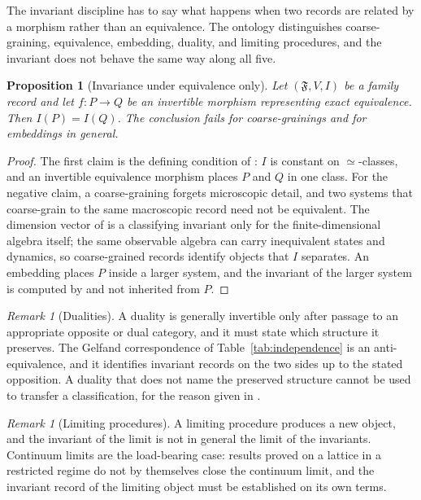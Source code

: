 \documentclass[11pt,letterpaper]{article}
\newtheorem{proposition}[theorem]{Proposition}
\theoremstyle{definition}
\theoremstyle{remark}
\newtheorem{remark}[theorem]{Remark}
\begin{document}
The invariant discipline has to say what happens when two records are related by a morphism rather than an equivalence. The ontology distinguishes coarse-graining, equivalence, embedding, duality, and limiting procedures, and the invariant does not behave the same way along all five.

\begin{proposition}[Invariance under equivalence only]
\label{prop:invariance}
Let $(\mathfrak{F}, V, I)$ be a family record and let $f \colon P \to Q$ be an invertible morphism representing exact equivalence. Then $I(P) = I(Q)$. The conclusion fails for coarse-grainings and for embeddings in general.
\end{proposition}

\begin{proof}
The first claim is the defining condition of : $I$ is constant on $\simeq$-classes, and an invertible equivalence morphism places $P$ and $Q$ in one class. For the negative claim, a coarse-graining forgets microscopic detail, and two systems that coarse-grain to the same macroscopic record need not be equivalent. The dimension vector of  is a classifying invariant only for the finite-dimensional algebra itself; the same observable algebra can carry inequivalent states and dynamics, so coarse-grained records identify objects that $I$ separates. An embedding places $P$ inside a larger system, and the invariant of the larger system is computed by  and not inherited from $P$.
\end{proof}

\begin{remark}[Dualities]
\label{rem:duality}
A duality is generally invertible only after passage to an appropriate opposite or dual category, and it must state which structure it preserves. The Gelfand correspondence of Table~\ref{tab:independence} is an anti-equivalence, and it identifies invariant records on the two sides up to the stated opposition. A duality that does not name the preserved structure cannot be used to transfer a classification, for the reason given in .
\end{remark}

\begin{remark}[Limiting procedures]
\label{rem:limits}
A limiting procedure produces a new object, and the invariant of the limit is not in general the limit of the invariants. Continuum limits are the load-bearing case: results proved on a lattice in a restricted regime do not by themselves close the continuum limit, and the invariant record of the limiting object must be established on its own terms.
\end{remark}
\end{document}
